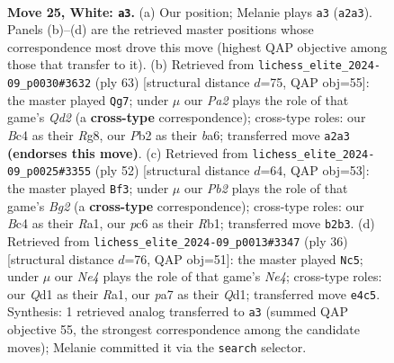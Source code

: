 \documentclass[11pt]{article}
\begin{document}
\begin{figure}[p]
\label{fig:thought-m46}
\end{figure}

\clearpage

\begin{figure}[p]\centering
\begin{subfigure}{0.46\textwidth}\centering
\resizebox{\linewidth}{!}{%
\newchessgame
\chessboard[
  setfen={rnb5/pp2q1k1/2p1r1p1/6pp/2BPN3/5PP1/PP2R2P/2RQ2K1 w - - 2 25},
  showmover=false,
  pgfstyle=straightmove, color=movearrow, markmove={a2-a3}
]}
\caption{}
\end{subfigure}\hfill
\begin{subfigure}{0.46\textwidth}\centering
\resizebox{\linewidth}{!}{%
\newchessgame
\chessboard[
  setfen={6rk/p1rq3p/Bpn1p3/3p1p1b/3P1P2/PNR1Q3/1P3P1P/5R1K b - - 15 32},
  showmover=false,
  pgfstyle=straightmove, color=movearrow, markmove={d7-g7}
]}
\caption{}
\end{subfigure}
\\[4pt]
\begin{subfigure}{0.46\textwidth}\centering
\resizebox{\linewidth}{!}{%
\newchessgame
\chessboard[
  setfen={r3r1k1/2pb2p1/n2p1q1p/P2P1p2/1p1N1P2/6P1/3QP1BP/RR4K1 w - - 0 27},
  showmover=false,
  pgfstyle=straightmove, color=movearrow, markmove={g2-f3}
]}
\caption{}
\end{subfigure}\hfill
\begin{subfigure}{0.46\textwidth}\centering
\resizebox{\linewidth}{!}{%
\newchessgame
\chessboard[
  setfen={2kr3r/p1p1q1p1/2p2p2/3n1b2/3PN2p/2P5/PP1B1PPK/R2QR3 w - - 2 19},
  showmover=false,
  pgfstyle=straightmove, color=movearrow, markmove={e4-c5}
]}
\caption{}
\end{subfigure}
\caption{\textbf{Move 25, White: \texttt{a3}.} (a) Our position; Melanie plays \texttt{a3} (\texttt{a2a3}). Panels (b)--(d) are the retrieved master positions whose correspondence most drove this move (highest QAP objective among those that transfer to it). (b) Retrieved from \texttt{lichess\_elite\_2024-09\_p0030\#3632} (ply 63) [structural distance $d$=75, QAP obj=55]: the master played \texttt{Qg7}; under $\mu$ our \emph{Pa2} plays the role of that game's \emph{Qd2} (a \textbf{cross-type} correspondence); cross-type roles: our \emph{B}c4 as their \emph{R}g8, our \emph{P}b2 as their \emph{b}a6; transferred move \texttt{a2a3} \textbf{(endorses this move)}. (c) Retrieved from \texttt{lichess\_elite\_2024-09\_p0025\#3355} (ply 52) [structural distance $d$=64, QAP obj=53]: the master played \texttt{Bf3}; under $\mu$ our \emph{Pb2} plays the role of that game's \emph{Bg2} (a \textbf{cross-type} correspondence); cross-type roles: our \emph{B}c4 as their \emph{R}a1, our \emph{p}c6 as their \emph{R}b1; transferred move \texttt{b2b3}. (d) Retrieved from \texttt{lichess\_elite\_2024-09\_p0013\#3347} (ply 36) [structural distance $d$=76, QAP obj=51]: the master played \texttt{Nc5}; under $\mu$ our \emph{Ne4} plays the role of that game's \emph{Ne4}; cross-type roles: our \emph{Q}d1 as their \emph{R}a1, our \emph{p}a7 as their \emph{Q}d1; transferred move \texttt{e4c5}. Synthesis: 1 retrieved analog transferred to \texttt{a3} (summed QAP objective 55, the strongest correspondence among the candidate moves); Melanie committed it via the \texttt{search} selector.}

\end{figure}
\end{document}
